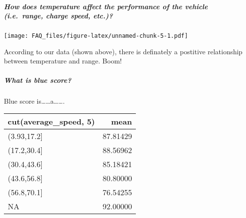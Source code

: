 \documentclass[]{article}
\let\oldsubparagraph\subparagraph
\renewcommand{\subparagraph}[1]{\oldsubparagraph{#1}\mbox{}}
\begin{document}
\hypertarget{how-does-temperature-affect-the-performance-of-the-vehicle-i.e.-range-charge-speed-etc.}{%
\subparagraph{How does temperature affect the performance of the vehicle
(i.e.~range, charge speed,
etc.)?}\label{how-does-temperature-affect-the-performance-of-the-vehicle-i.e.-range-charge-speed-etc.}}

\texttt{[image: FAQ\_files/figure-latex/unnamed-chunk-5-1.pdf]}

According to our data (shown above), there is definately a postitive
relationship between temperature and range. Boom!

\hypertarget{what-is-blue-score}{%
\subparagraph{What is blue score?}\label{what-is-blue-score}}

Blue score is\ldots{}\ldots{}a\ldots{}\ldots{}.

\begin{tabular}{l|r}
\hline
cut(average\_speed, 5) & mean\\
\hline
(3.93,17.2] & 87.81429\\
\hline
(17.2,30.4] & 88.56962\\
\hline
(30.4,43.6] & 85.18421\\
\hline
(43.6,56.8] & 80.80000\\
\hline
(56.8,70.1] & 76.54255\\
\hline
NA & 92.00000\\
\hline
\end{tabular}
\end{document}
